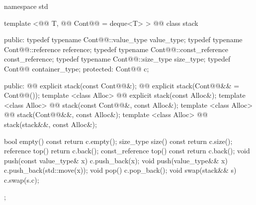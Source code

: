 \documentclass[american,twoside]{book}
\begin{document}
\begin{codeblock}
namespace std {
  template <@@ T, @@ Cont@@ = deque<T> >
  @@
  class stack {
  public:
    typedef typename Cont@@::value_type            value_type;
    typedef typename Cont@@::reference             reference;
    typedef typename Cont@@::const_reference       const_reference;
    typedef typename Cont@@::size_type             size_type;
    typedef          Cont@@                        container_type;
  protected:
    Cont@@ c;

  public:
    @@ explicit stack(const Cont@@&);
    @@ explicit stack(Cont@@&& = Cont@@());
    template <class Alloc> 
      @@
      explicit stack(const Alloc&);
    template <class Alloc> 
      @@
      stack(const Cont@@&, const Alloc&);
    template <class Alloc> 
      @@
      stack(Cont@@&&, const Alloc&);
    template <class Alloc> 
      @@
      stack(stack&&, const Alloc&);

    bool      empty() const             { return c.empty(); }
    size_type size()  const             { return c.size(); }
    reference         top()             { return c.back(); }
    const_reference   top() const       { return c.back(); }
    void push(const value_type& x)      { c.push_back(x); }
    void push(value_type&& x)           { c.push_back(std::move(x)); }
    void pop()                          { c.pop_back(); }
    void swap(stack&& s)                { c.swap(s.c); }
  };

}
\end{codeblock}
\end{document}
